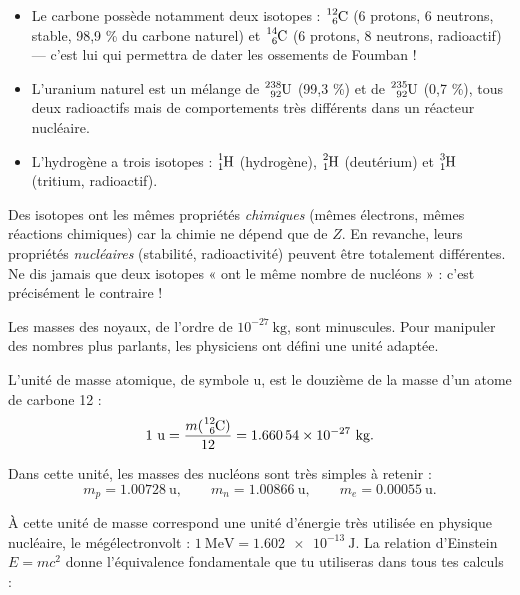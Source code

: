 \documentclass[11pt]{article}
\newcommand{\cle}[1]{{\popxbold\color{popdark}#1}}
\newcounter{popsec}
\newcounter{popsub}
\newcommand{\courssub}[1]{%
  \stepcounter{popsub}%
  \par\vspace{9pt}\noindent{\popxbold\fontsize{11.5}{13}\selectfont\color{popink}{\color{poporange}\thepopsec.\thepopsub}\hspace{6pt}#1}\par\nopagebreak\vspace{4pt}
}
\begin{document}
\begin{exemplebox}
\begin{itemize}
\item Le carbone possède notamment deux isotopes : $\ce{^{12}_{6}C}$ (6 protons, 6 neutrons, stable, 98,9 \% du carbone naturel) et $\ce{^{14}_{6}C}$ (6 protons, 8 neutrons, radioactif) — c'est lui qui permettra de dater les ossements de Foumban !
\item L'uranium naturel est un mélange de $\ce{^{238}_{92}U}$ (99,3 \%) et de $\ce{^{235}_{92}U}$ (0,7 \%), tous deux radioactifs mais de comportements très différents dans un réacteur nucléaire.
\item L'hydrogène a trois isotopes : $\ce{^{1}_{1}H}$ (hydrogène), $\ce{^{2}_{1}H}$ (deutérium) et $\ce{^{3}_{1}H}$ (tritium, radioactif).
\end{itemize}
\end{exemplebox}

\begin{attention}[Isotopes = même chimie, mais pas même noyau]
Des isotopes ont les mêmes propriétés \emph{chimiques} (mêmes électrons, mêmes réactions chimiques) car la chimie ne dépend que de $Z$. En revanche, leurs propriétés \emph{nucléaires} (stabilité, radioactivité) peuvent être totalement différentes. Ne dis jamais que deux isotopes « ont le même nombre de nucléons » : c'est précisément le contraire !
\end{attention}

\courssub{L'unité de masse atomique}

Les masses des noyaux, de l'ordre de $10^{-27}\ \text{kg}$, sont minuscules. Pour manipuler des nombres plus parlants, les physiciens ont défini une unité adaptée.

\begin{definition}
L'\cle{unité de masse atomique}, de symbole $\text{u}$, est le douzième de la masse d'un atome de carbone 12 :
\[ 1\ \text{u} = \frac{m(\ce{^{12}_{6}C})}{12} = \num{1,66054e-27}\ \text{kg}. \]
\end{definition}

Dans cette unité, les masses des nucléons sont très simples à retenir :
\[ m_p = \num{1,00728}\ \text{u}, \qquad m_n = \num{1,00866}\ \text{u}, \qquad m_e = \num{0,00055}\ \text{u}. \]

À cette unité de masse correspond une unité d'énergie très utilisée en physique nucléaire, le \cle{mégélectronvolt} : $1\ \text{MeV} = \num{1,602e-13}\ \text{J}$. La relation d'Einstein $E = mc^2$ donne l'équivalence fondamentale que tu utiliseras dans tous tes calculs :
\end{document}
